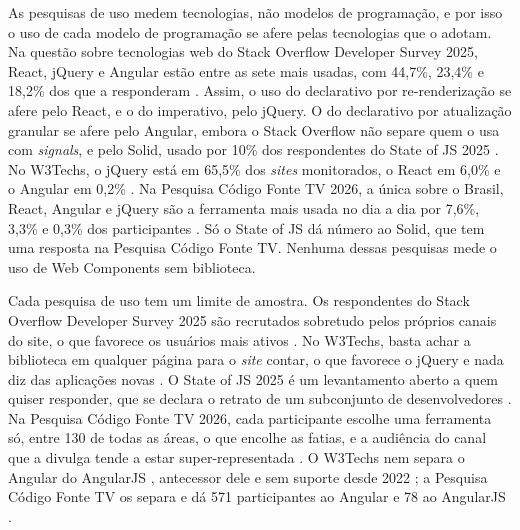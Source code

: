 As pesquisas de uso medem tecnologias, não modelos de programação, e por
isso o uso de cada modelo de programação se afere pelas tecnologias que o
adotam.
Na questão sobre tecnologias web do Stack Overflow Developer Survey 2025,
React, jQuery e Angular estão entre as sete mais usadas, com 44,7\%, 23,4\% e
18,2\% dos que a responderam \cite{stackoverflow2025}.
Assim, o uso do declarativo por re-renderização se afere pelo React, e o
do imperativo, pelo jQuery.
O do declarativo por atualização granular se afere pelo Angular, embora o
Stack Overflow não separe quem o usa com \emph{signals}, e pelo Solid, usado por 10\%
dos respondentes do State of JS 2025 \cite{devographics2026}.
No W3Techs, o jQuery está em 65,5\% dos \emph{sites} monitorados, o React em
6,0\% e o Angular em 0,2\% \cite{w3techs2026}.
Na Pesquisa Código Fonte TV 2026, a única sobre o Brasil, React, Angular e
jQuery são a ferramenta mais usada no dia a dia por 7,6\%, 3,3\% e 0,3\% dos
participantes \cite{codigofonte2026}.
Só o State of JS dá número ao Solid, que tem uma resposta na Pesquisa
Código Fonte TV.
Nenhuma dessas pesquisas mede o uso de Web Components sem biblioteca.

Cada pesquisa de uso tem um limite de amostra.
Os respondentes do Stack Overflow Developer Survey 2025 são recrutados
sobretudo pelos próprios canais do site, o que favorece os usuários mais
ativos \cite{stackoverflow2025}.
No W3Techs, basta achar a biblioteca em qualquer página para o \emph{site}
contar, o que favorece o jQuery e nada diz das aplicações novas
\cite{w3techs2026,w3techs2026a}.
O State of JS 2025 é um levantamento aberto a quem quiser responder, que se
declara o retrato de um subconjunto de desenvolvedores \cite{devographics2026}.
Na Pesquisa Código Fonte TV 2026, cada participante escolhe uma
ferramenta só, entre 130 de todas as áreas, o que encolhe as fatias, e a
audiência do canal que a divulga tende a estar super-representada
\cite{codigofonte2026}.
O W3Techs nem separa o Angular do AngularJS \cite{w3techs2026b}, antecessor dele e sem
suporte desde 2022 \cite{thompson2022}; a Pesquisa Código Fonte TV os
separa e dá 571 participantes ao Angular e 78 ao AngularJS
\cite{codigofonte2026}.
